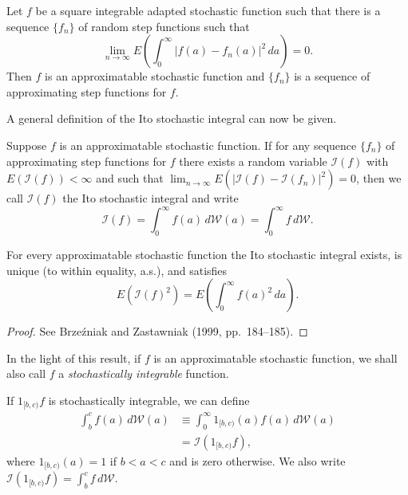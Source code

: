 \begin{definition}\label{def:approximatable}
Let $f$ be a square integrable adapted stochastic function such that there is a sequence $\{f_n\}$ of random step functions such that
\[
\lim_{n\to\infty} E\!\left(\int_0^{\infty} |f(a) - f_n(a)|^2\,da\right) = 0.
\]
Then $f$ is an approximatable stochastic function and $\{f_n\}$ is a sequence of approximating step functions for $f$.
\end{definition}

A general definition of the Ito stochastic integral can now be given.

\begin{definition}\label{def:ito-general}
Suppose $f$ is an approximatable stochastic function. If for any sequence $\{f_n\}$ of approximating step functions for $f$ there exists a random variable $\mathcal{I}(f)$ with $E(\mathcal{I}(f)) < \infty$ and such that $\lim_{n\to\infty} E\!\left(|\mathcal{I}(f) - \mathcal{I}(f_n)|^2\right) = 0$, then we call $\mathcal{I}(f)$ the Ito stochastic integral and write
\[
\mathcal{I}(f) = \int_0^{\infty} f(a)\,d\mathcal{W}(a) = \int_0^{\infty} f\,d\mathcal{W}.
\]
\end{definition}

\begin{proposition}\label{prop:ito-unique}
For every approximatable stochastic function the Ito stochastic integral exists, is unique (to within equality, a.s.), and satisfies
\[
E\!\left(\mathcal{I}(f)^2\right) = E\!\left(\int_0^{\infty} f(a)^2\,da\right).
\]
\end{proposition}

\begin{proof}
See Brze\'{z}niak and Zastawniak (1999, pp.\ 184--185).
\end{proof}

In the light of this result, if $f$ is an approximatable stochastic function, we shall also call $f$ a \emph{stochastically integrable} function.

If $1_{[b,c)} f$ is stochastically integrable, we can define
\begin{align*}
\int_b^c f(a)\,d\mathcal{W}(a) &\equiv \int_0^{\infty} 1_{[b,c)}(a)f(a)\,d\mathcal{W}(a) \\
&= \mathcal{I}(1_{[b,c)} f),
\end{align*}
where $1_{[b,c)}(a) = 1$ if $b < a < c$ and is zero otherwise. We also write $\mathcal{I}(1_{[b,c)} f) = \int_b^c f\,d\mathcal{W}$.

